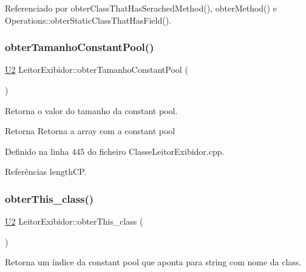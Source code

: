 Referenciado por obter\+Class\+That\+Has\+Serached\+Method(), obter\+Method() e Operations\+::obter\+Static\+Class\+That\+Has\+Field().

\mbox{\label{classLeitorExibidor_a7e64ad9d2b5f914f6bc4a0f84129f160}} 
\subsubsection{\texorpdfstring{obter\+Tamanho\+Constant\+Pool()}{obterTamanhoConstantPool()}}
{\footnotesize\ttfamily \hyperlink{BasicTypes_8h_a90240657108b1b457eef9d3f76e0202e}{U2} Leitor\+Exibidor\+::obter\+Tamanho\+Constant\+Pool (\begin{DoxyParamCaption}{ }\end{DoxyParamCaption})}



Retorna o valor do tamanho da constant pool. 

\begin{DoxyReturn}{Retorna}
Retorna a array com a constant pool 
\end{DoxyReturn}


Definido na linha 445 do ficheiro Classe\+Leitor\+Exibidor.\+cpp.



Referências length\+CP.

\mbox{\label{classLeitorExibidor_aa5cc18c3fb83811379d2f221980d8b8b}} 
\subsubsection{\texorpdfstring{obter\+This\+\_\+class()}{obterThis\_class()}}
{\footnotesize\ttfamily \hyperlink{BasicTypes_8h_a90240657108b1b457eef9d3f76e0202e}{U2} Leitor\+Exibidor\+::obter\+This\+\_\+class (\begin{DoxyParamCaption}{ }\end{DoxyParamCaption})}



Retorna um índice da constant pool que aponta para string com nome da class. 

